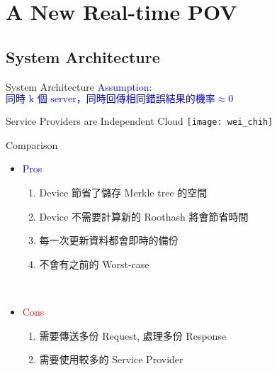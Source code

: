 \section{A New Real-time POV}

\subsection{System Architecture}
\begin{frame}{System Architecture}
	\textcolor{blue}{Assumption:\\ \tab{} $\text{同時 k 個 server，同時回傳相同錯誤結果的機率} \approx 0$}
	\begin{center}
		\alert{Service Providers are Independent Cloud}
		\texttt{[image: wei\_chih]}
	\end{center}
\end{frame}

\begin{frame}{Comparison}
	\begin{itemize}
		\item \textcolor{blue}{Pros}
			\begin{enumerate}
				\item Device 節省了儲存 Merkle tree 的空間
                \item Device 不需要計算新的 Roothash 將會節省時間
				\item 每一次更新資料都會即時的備份
				\item 不會有之前的 Worst-case
			\end{enumerate}
		~\\
		\item \textcolor{red}{Cons}
			\begin{enumerate}
				\item 需要傳送多份 Request, 處理多份 Response
                \item 需要使用較多的 Service Provider
			\end{enumerate}
	\end{itemize}
\end{frame}

